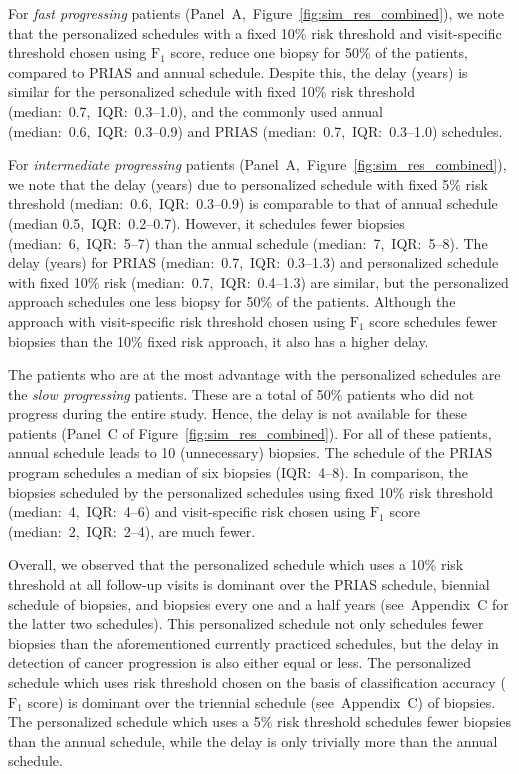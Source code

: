 For \textit{fast progressing} patients (Panel~A,~Figure~\ref{fig:sim_res_combined}), we note that the personalized schedules with a fixed 10\% risk threshold and visit-specific threshold chosen using $\mbox{F}_1$ score, reduce one biopsy for 50\% of the patients, compared to PRIAS and annual schedule. Despite this, the delay (years) is similar for the personalized schedule with fixed 10\% risk threshold (median:~0.7,~IQR:~0.3--1.0), and the commonly used annual (median:~0.6,~IQR:~0.3--0.9) and PRIAS (median:~0.7,~IQR:~0.3--1.0) schedules.

For \textit{intermediate progressing} patients (Panel~A,~Figure~\ref{fig:sim_res_combined}), we note that the delay (years) due to personalized schedule with fixed 5\% risk threshold (median:~0.6,~IQR:~0.3--0.9) is comparable to that of annual schedule (median 0.5,~IQR:~0.2--0.7). However, it schedules fewer biopsies (median:~6,~IQR:~5--7) than the annual schedule (median:~7,~IQR:~5--8). The delay (years) for PRIAS (median:~0.7,~IQR:~0.3--1.3) and personalized schedule with fixed 10\% risk (median:~0.7,~IQR:~0.4--1.3) are similar, but the personalized approach schedules one less biopsy for 50\% of the patients. Although the approach with visit-specific risk threshold chosen using $\mbox{F}_1$ score schedules fewer biopsies than the 10\% fixed risk approach, it also has a higher delay.

The patients who are at the most advantage with the personalized schedules are the \textit{slow progressing} patients. These are a total of 50\% patients who did not progress during the entire study. Hence, the delay is not available for these patients (Panel~C of Figure~\ref{fig:sim_res_combined}). For all of these patients, annual schedule leads to 10 (unnecessary) biopsies. The schedule of the PRIAS program schedules a median of six biopsies (IQR:~4--8). In comparison, the biopsies scheduled by the personalized schedules using fixed 10\% risk threshold (median:~4,~IQR:~4--6) and visit-specific risk chosen using $\mbox{F}_1$ score (median:~2,~IQR:~2--4), are much fewer.

Overall, we observed that the personalized schedule which uses a 10\% risk threshold at all follow-up visits is dominant over the PRIAS schedule, biennial schedule of biopsies, and biopsies every one and a half years (see~Appendix~C for the latter two schedules). This personalized schedule not only schedules fewer biopsies than the aforementioned currently practiced schedules, but the delay in detection of cancer progression is also either equal or less. The personalized schedule which uses risk threshold chosen on the basis of classification accuracy ($\mbox{F}_1$ score) is dominant over the triennial schedule (see~Appendix~C) of biopsies. The personalized schedule which uses a 5\% risk threshold schedules fewer biopsies than the annual schedule, while the delay is only trivially more than the annual schedule.

